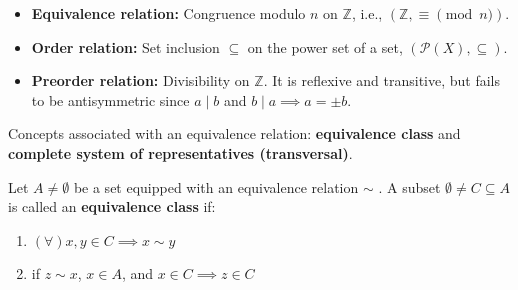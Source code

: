 \begin{example}\leavevmode
\begin{itemize}
    \item \textbf{Equivalence relation:} Congruence modulo $n$ on $\mathbb{Z}$, i.e., $(\mathbb{Z}, \equiv \pmod n)$.
    \item \textbf{Order relation:} Set inclusion $\subseteq$ on the power set of a set, $(\mathcal{P}(X), \subseteq)$.
    \item \textbf{Preorder relation:} Divisibility on $\mathbb{Z}$. It is reflexive and transitive, but fails to be antisymmetric since $a \mid b$ and $b \mid a \implies a = \pm b$.
\end{itemize}
\end{example}

\vspace{1em}
Concepts associated with an equivalence relation: \textbf{equivalence class} and \textbf{complete system of representatives (transversal)}.

\begin{definition}
Let $A \neq \emptyset$ be a set equipped with an equivalence relation $\sim$ . A subset $\emptyset \neq C \subseteq A$ is called an \textbf{equivalence class} if:
\begin{enumerate}
    \item $(\forall) x, y \in C \implies x \sim y$
    \item if $z \sim x$, $x \in A$, and $x \in C \implies z \in C$
\end{enumerate}
\end{definition}


